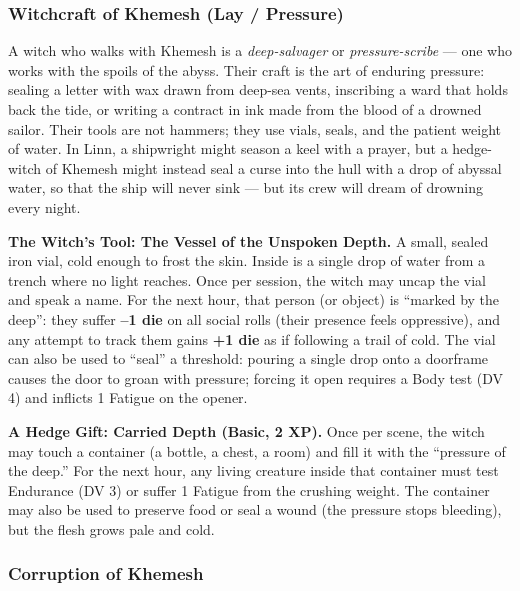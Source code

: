 \subsubsection*{Witchcraft of Khemesh (Lay / Pressure)}

A witch who walks with Khemesh is a \textit{deep-salvager} or \textit{pressure-scribe} --- one who works with the spoils of the abyss. Their craft is the art of enduring pressure: sealing a letter with wax drawn from deep-sea vents, inscribing a ward that holds back the tide, or writing a contract in ink made from the blood of a drowned sailor. Their tools are not hammers; they use vials, seals, and the patient weight of water. In Linn, a shipwright might season a keel with a prayer, but a hedge-witch of Khemesh might instead seal a curse into the hull with a drop of abyssal water, so that the ship will never sink --- but its crew will dream of drowning every night.

\textbf{The Witch's Tool: The Vessel of the Unspoken Depth.} A small, sealed iron vial, cold enough to frost the skin. Inside is a single drop of water from a trench where no light reaches. Once per session, the witch may uncap the vial and speak a name. For the next hour, that person (or object) is ``marked by the deep'': they suffer \textbf{--1 die} on all social rolls (their presence feels oppressive), and any attempt to track them gains \textbf{+1 die} as if following a trail of cold. The vial can also be used to ``seal'' a threshold: pouring a single drop onto a doorframe causes the door to groan with pressure; forcing it open requires a Body test (DV 4) and inflicts 1 Fatigue on the opener.

\textbf{A Hedge Gift: Carried Depth (Basic, 2 XP).} Once per scene, the witch may touch a container (a bottle, a chest, a room) and fill it with the ``pressure of the deep.'' For the next hour, any living creature inside that container must test Endurance (DV 3) or suffer 1 Fatigue from the crushing weight. The container may also be used to preserve food or seal a wound (the pressure stops bleeding), but the flesh grows pale and cold.

\subsubsection*{Corruption of Khemesh}


